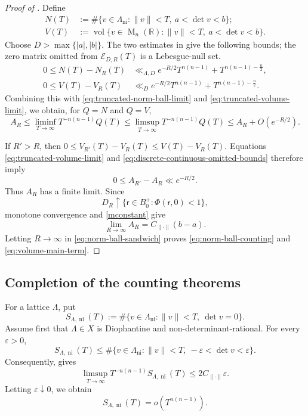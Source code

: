 \documentclass[reqno,11pt]{amsart}
\numberwithin{equation}{section}
\theoremstyle{definition}
\theoremstyle{remark}
\newcommand{\op}{\operatorname}
\newcommand{\M}{\op{M}}
\begin{document}
\begin{proof}[Proof of
]
Define
$$
\begin{aligned}
N(T)
&:=
\#\{v\in\Lambda_{\operatorname{ni}}:
\|v\|<T,\ a<\det v<b\};\\
V(T)
&:=
\operatorname{vol}\{v\in\M_n(\mathbb R):
\|v\|<T,\ a<\det v<b\}.
\end{aligned}
$$
Choose $D>\max\{|a|,|b|\}$. The two estimates in
 give the following bounds; the
zero matrix omitted from $\mathcal E_{D,R}(T)$ is a Lebesgue-null set.
\begin{equation}\label{eq:discrete-continuous-omitted-bounds}
\begin{aligned}
0\le N(T)-N_R(T)
&\ll_{\Lambda,D}e^{-R/2}T^{n(n-1)}+T^{n(n-1)-\frac n2},\\
0\le V(T)-V_R(T)
&\ll_D e^{-R/2}T^{n(n-1)}+T^{n(n-1)-\frac n2}.
\end{aligned}
\end{equation}
Combining this with
\eqref{eq:truncated-norm-ball-limit} and
\eqref{eq:truncated-volume-limit}, we obtain, for $Q=N$ and $Q=V$,
\begin{equation}\label{eq:norm-ball-sandwich}
A_R
\le
\liminf_{T\to\infty}T^{-n(n-1)}Q(T)
\le
\limsup_{T\to\infty}T^{-n(n-1)}Q(T)
\le
A_R+O(e^{-R/2}).
\end{equation}

If $R'>R$, then
$
0\le V_{R'}(T)-V_R(T)\le V(T)-V_R(T).
$
Equations \eqref{eq:truncated-volume-limit} and
\eqref{eq:discrete-continuous-omitted-bounds} therefore imply
$$
0\le A_{R'}-A_R\ll e^{-R/2}.
$$
Thus $A_R$ has a finite limit. Since
$$
D_R\uparrow
\{\mathsf r\in B_0^+:\Phi(\mathsf r,0)<1\},
$$
monotone convergence and \eqref{mconstant} give
$$
\lim_{R\to\infty}A_R=C_{\|\cdot\|}(b-a).
$$
Letting $R\to\infty$ in \eqref{eq:norm-ball-sandwich} proves
\eqref{eq:norm-ball-counting} and \eqref{eq:volume-main-term}.
\end{proof}
\subsection{Completion of the counting theorems}\label{isoo}

For a lattice $\Lambda$, put
$$
S_{\Lambda,\operatorname{ni}}(T)
:=
\#\{v\in\Lambda_{\operatorname{ni}}:
\|v\|<T,\ \det v=0\}.
$$
Assume first that $\Lambda\in X$ is Diophantine and
non-determinant-rational. For every $\varepsilon>0$,
$$
S_{\Lambda,\operatorname{ni}}(T)
\le
\#\{v\in\Lambda_{\operatorname{ni}}:
\|v\|<T,\ -\varepsilon<\det v<\varepsilon\}.
$$
Consequently,  gives
$$
\limsup_{T\to\infty}T^{-n(n-1)}S_{\Lambda,\operatorname{ni}}(T)
\le2C_{\|\cdot\|}\varepsilon.
$$
Letting $\varepsilon\downarrow0$, we obtain
\begin{equation}\label{eq:nonisotropic-singular-negligible}
S_{\Lambda,\operatorname{ni}}(T)=o(T^{n(n-1)}).
\end{equation}
\end{document}

